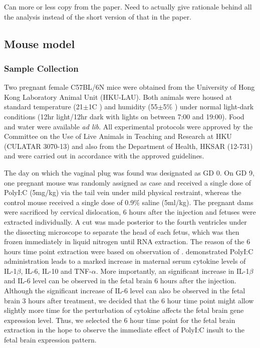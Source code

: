 

Can more or less copy from the paper. 
Need to actually give rationale behind all the analysis instead of the short version of that in the paper.
\subsection{Mouse model}
\subsubsection{Sample Collection}
Two pregnant female C57BL/6N mice were obtained from the University of Hong Kong Laboratory Animal Unit (HKU-LAU).
Both animals were housed at standard temperature (21$\pm$1\degree C ) and humidity (55$\pm$5$\%$ ) under normal light-dark conditions (12hr light/12hr dark with lights on between 7:00 and 19:00).
Food and water were available \textit{ad lib}.
All experimental protocols were approved by the Committee on the Use of Live Animals in Teaching and Research at HKU (CULATAR 3070-13) and also from the Department of Health, HKSAR (12-731) and were carried out in accordance with the approved guidelines. 

The day on which the vaginal plug was found was designated as GD 0.
On GD 9, one pregnant mouse was randomly assigned as case and received a single dose of PolyI:C (5mg/kg) via the tail vein under mild physical restraint, whereas the control mouse received a single dose of 0.9$\%$ saline (5ml/kg)\cite{Li2009c}.
The pregnant dams were sacrificed by cervical dislocation, 6 hours after the injection and fetuses were extracted individually.
A cut was made posterior to the fourth ventricles under the dissecting microscope to separate the head of each fetus\cite{Mason1993a}, which was then frozen immediately in liquid nitrogen until RNA extraction. 
The reason of the 6 hours time point extraction were based on observation of \citet{Meyer2006}.
\citet{Meyer2006} demonstrated PolyI:C administration leads to a marked increase in maternal serum cytokine levels of IL-1$\beta$, IL-6, IL-10 and TNF-$\alpha$.
More importantly, an significant increase in IL-1$\beta$ and IL-6 level can be observed in the fetal brain 6 hours after the injection. 
Although the significant increase of IL-6 level can also be observed in the fetal brain 3 hours after treatment, we decided that the 6 hour time point might allow slightly more time for the perturbation of cytokine affects the fetal brain gene expression level. 
Thus, we selected the 6 hour time point for the fetal brain extraction in the hope to observe the immediate effect of PolyI:C insult to the fetal brain expression pattern.

